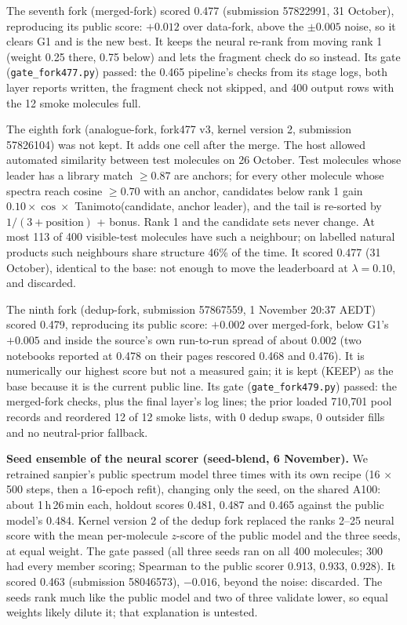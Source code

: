 \documentclass[11pt]{article}
\begin{document}
The seventh fork (merged-fork) scored 0.477 (submission 57822991, 31 October), reproducing its public
score: $+0.012$ over data-fork, above the $\pm 0.005$ noise, so it clears G1 and is the new best. It keeps
the neural re-rank from moving rank 1 (weight 0.25 there, 0.75 below) and lets the fragment check do so
instead. Its gate (\texttt{gate\_fork477.py}) passed: the 0.465 pipeline's checks from its stage logs, both
layer reports written, the fragment check not skipped, and 400 output rows with the 12 smoke molecules full.

The eighth fork (analogue-fork, fork477 v3, kernel version 2, submission 57826104) was not
kept. It adds one cell after the merge. The host
allowed automated similarity between test molecules on 26 October. Test molecules whose leader has a
library match $\geq 0.87$ are anchors; for every other molecule whose spectra reach cosine $\geq 0.70$ with
an anchor, candidates below rank 1 gain $0.10 \times \cos \times$ Tanimoto(candidate, anchor leader), and
the tail is re-sorted by $1/(3 + \text{position})$ + bonus. Rank 1 and the candidate sets never change. At
most 113 of 400 visible-test molecules have such a neighbour; on labelled natural products such neighbours
share structure 46\% of the time. It scored 0.477 (31 October), identical to the base: not enough to move
the leaderboard at $\lambda = 0.10$, and discarded.

The ninth fork (dedup-fork, submission 57867559, 1 November 20:37 AEDT) scored 0.479, reproducing its public
score: $+0.002$ over merged-fork, below G1's $+0.005$ and inside the source's own run-to-run spread of about
0.002 (two notebooks reported at 0.478 on their pages rescored 0.468 and 0.476). It is numerically our highest
score but not a measured gain; it is kept (KEEP) as the base because it is the current public line. Its gate
(\texttt{gate\_fork479.py}) passed: the merged-fork checks, plus the final layer's log lines; the prior loaded
710{,}701 pool records and reordered 12 of 12 smoke lists, with 0 dedup swaps, 0 outsider fills and no
neutral-prior fallback.

\textbf{Seed ensemble of the neural scorer (seed-blend, 6 November).} We retrained sanpier's public spectrum model three
times with its own recipe (16 $\times$ 500 steps, then a 16-epoch refit), changing only the seed, on the shared A100:
about 1\,h\,26\,min each, holdout scores 0.481, 0.487 and 0.465 against the public model's 0.484. Kernel version 2 of
the dedup fork replaced the ranks 2--25 neural score with the mean per-molecule $z$-score of the public model and the
three seeds, at equal weight. The gate passed (all three seeds ran on all 400 molecules; 300 had every member scoring;
Spearman to the public scorer 0.913, 0.933, 0.928). It scored 0.463 (submission 58046573), $-0.016$, beyond the noise:
discarded. The seeds rank much like the public model and two of three validate lower, so equal weights likely dilute it;
that explanation is untested.
\end{document}
